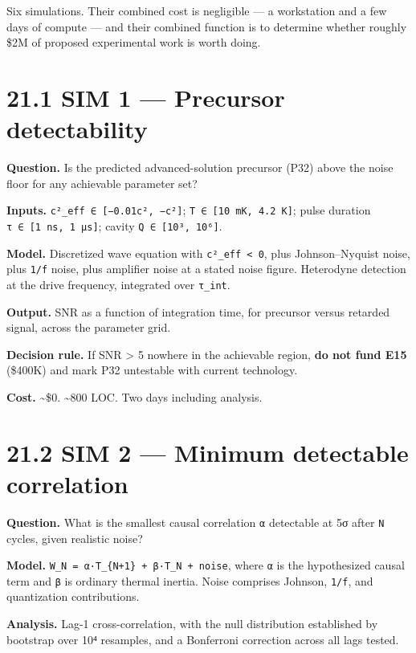 \documentclass[
  11pt]{report}
\begin{document}
Six simulations. Their combined cost is negligible --- a workstation and
a few days of compute --- and their combined function is to determine
whether roughly \$2M of proposed experimental work is worth doing.

\hypertarget{sim-1-precursor-detectability}{%
\section{21.1 SIM 1 --- Precursor
detectability}\label{sim-1-precursor-detectability}}

\textbf{Question.} Is the predicted advanced-solution precursor (P32)
above the noise floor for any achievable parameter set?

\textbf{Inputs.} \texttt{c²\_eff\ ∈\ {[}−0.01c²,\ −c²{]}};
\texttt{T\ ∈\ {[}10\ mK,\ 4.2\ K{]}}; pulse duration
\texttt{τ\ ∈\ {[}1\ ns,\ 1\ μs{]}}; cavity
\texttt{Q\ ∈\ {[}10³,\ 10⁶{]}}.

\textbf{Model.} Discretized wave equation with
\texttt{c²\_eff\ \textless{}\ 0}, plus Johnson--Nyquist noise, plus
\texttt{1/f} noise, plus amplifier noise at a stated noise figure.
Heterodyne detection at the drive frequency, integrated over
\texttt{τ\_int}.

\textbf{Output.} SNR as a function of integration time, for precursor
versus retarded signal, across the parameter grid.

\textbf{Decision rule.} If SNR \textgreater{} 5 nowhere in the
achievable region, \textbf{do not fund E15} (\$400K) and mark P32
untestable with current technology.

\textbf{Cost.} \textasciitilde\$0. \textasciitilde800 LOC. Two days
including analysis.

\hypertarget{sim-2-minimum-detectable-correlation}{%
\section{21.2 SIM 2 --- Minimum detectable
correlation}\label{sim-2-minimum-detectable-correlation}}

\textbf{Question.} What is the smallest causal correlation \texttt{α}
detectable at 5σ after \texttt{N} cycles, given realistic noise?

\textbf{Model.} \texttt{W\_N\ =\ α·T\_\{N+1\}\ +\ β·T\_N\ +\ noise},
where \texttt{α} is the hypothesized causal term and \texttt{β} is
ordinary thermal inertia. Noise comprises Johnson, \texttt{1/f}, and
quantization contributions.

\textbf{Analysis.} Lag-1 cross-correlation, with the null distribution
established by bootstrap over 10⁴ resamples, and a Bonferroni correction
across all lags tested.
\end{document}

